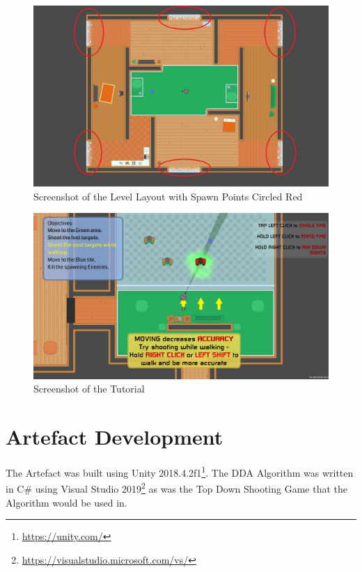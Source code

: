 \documentclass[journal]{IEEEtran}
\begin{document}
\begin{figure}[h]
	\includegraphics[width=1.0\linewidth]{artefactscreenshotlevelspawns.jpg}
	\caption{Screenshot of the Level Layout with Spawn Points Circled Red}
	\label{fig::3}
\end{figure} 


\begin{figure}[h]
	\includegraphics[width=1.0\linewidth]{tutorialscreenshot.jpg}
	\caption{Screenshot of the Tutorial}
	\label{fig::4}
\end{figure} 



\section{Artefact Development}

The Artefact was built using Unity 2018.4.2f1\footnote{\url{https://unity.com/}}. The DDA Algorithm was written in C\# using Visual Studio 2019\footnote{\url{https://visualstudio.microsoft.com/vs/}} as was the Top Down Shooting Game that the Algorithm would be used in. 
\end{document}
